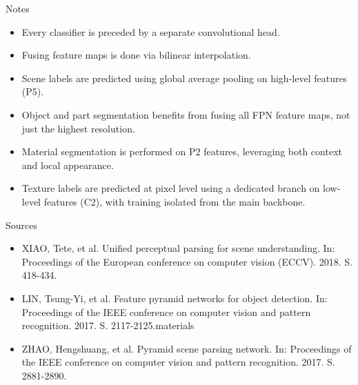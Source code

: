 \documentclass{beamer}
\begin{document}
\begin{frame}{Notes}
    \begin{itemize}
        \item Every classifier is preceded by a separate convolutional head.
        \item Fusing feature maps is done via bilinear interpolation.
        \item Scene labels are predicted using global average pooling on high-level features (P5).
        \item Object and part segmentation benefits from fusing all FPN feature maps, not just the highest resolution.
        \item Material segmentation is performed on P2 features, leveraging both context and local appearance.
        \item Texture labels are predicted at pixel level using a dedicated branch on low-level features (C2), with training isolated from the main backbone.
    \end{itemize}
\end{frame}


\begin{frame}{Sources}
    \begin{itemize}
        \item XIAO, Tete, et al. Unified perceptual parsing for scene understanding. In: Proceedings of the European conference on computer vision (ECCV). 2018. S. 418-434.
        \item LIN, Tsung-Yi, et al. Feature pyramid networks for object detection. In: Proceedings of the IEEE conference on computer vision and pattern recognition. 2017. S. 2117-2125.materials
        \item ZHAO, Hengshuang, et al. Pyramid scene parsing network. In: Proceedings of the IEEE conference on computer vision and pattern recognition. 2017. S. 2881-2890.
    \end{itemize}
\end{frame}
\end{document}
